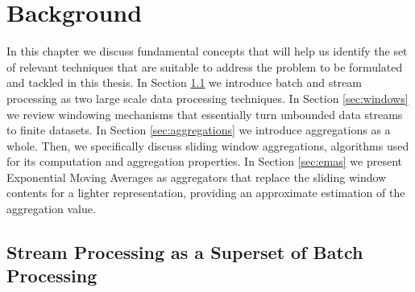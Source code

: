 \chapter{Background}\label{chap:background} \minitoc

In this chapter we discuss fundamental concepts that will help us identify the set of relevant techniques that are suitable to address the problem to be formulated and tackled in this thesis. In Section \ref{sec:stream-superset} we introduce batch and stream processing as two large scale data processing techniques. In Section \ref{sec:windows} we review windowing mechanisms that essentially turn unbounded data streams to finite datasets. In Section \ref{sec:aggregations} we introduce aggregations as a whole. Then, we specifically discuss sliding window aggregations, algorithms used for its computation and aggregation properties. In Section \ref{sec:emas} we present Exponential Moving Averages as aggregators that replace the sliding window contents for a lighter representation, providing an approximate estimation of the aggregation value.

\section{Stream Processing as a Superset of Batch Processing} \label{sec:stream-superset}

